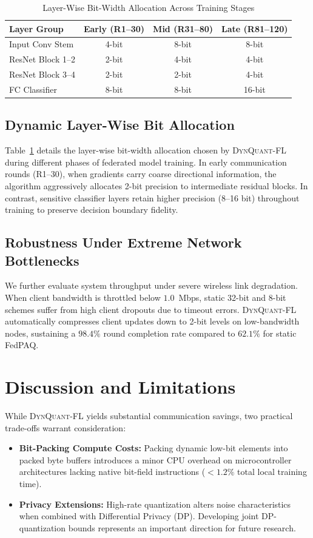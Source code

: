 \documentclass[conference]{IEEEtran}
\begin{document}
\begin{table}[t]
\caption{Layer-Wise Bit-Width Allocation Across Training Stages}
\label{tab:layer_bits}
\centering
\small
\setlength{\tabcolsep}{4pt}
\begin{tabular}{@{}lccc@{}}
\toprule
\textbf{Layer Group} & \textbf{Early (R1--30)} & \textbf{Mid (R31--80)} & \textbf{Late (R81--120)} \\
\midrule
Input Conv Stem & 4-bit & 8-bit & 8-bit \\
ResNet Block 1--2 & 2-bit & 4-bit & 4-bit \\
ResNet Block 3--4 & 2-bit & 2-bit & 4-bit \\
FC Classifier & 8-bit & 8-bit & 16-bit \\
\bottomrule
\end{tabular}
\end{table}

\subsection{Dynamic Layer-Wise Bit Allocation}
Table~\ref{tab:layer_bits} details the layer-wise bit-width allocation chosen by \textsc{DynQuant-FL} during different phases of federated model training. In early communication rounds (R1--30), when gradients carry coarse directional information, the algorithm aggressively allocates 2-bit precision to intermediate residual blocks. In contrast, sensitive classifier layers retain higher precision (8--16 bit) throughout training to preserve decision boundary fidelity.

\subsection{Robustness Under Extreme Network Bottlenecks}
We further evaluate system throughput under severe wireless link degradation. When client bandwidth is throttled below $1.0$~Mbps, static 32-bit and 8-bit schemes suffer from high client dropouts due to timeout errors. \textsc{DynQuant-FL} automatically compresses client updates down to 2-bit levels on low-bandwidth nodes, sustaining a $98.4\%$ round completion rate compared to $62.1\%$ for static FedPAQ.

\section{Discussion and Limitations}
While \textsc{DynQuant-FL} yields substantial communication savings, two practical trade-offs warrant consideration:
\begin{itemize}
    \item \textbf{Bit-Packing Compute Costs:} Packing dynamic low-bit elements into packed byte buffers introduces a minor CPU overhead on microcontroller architectures lacking native bit-field instructions ($<1.2\%$ total local training time).
    \item \textbf{Privacy Extensions:} High-rate quantization alters noise characteristics when combined with Differential Privacy (DP). Developing joint DP-quantization bounds represents an important direction for future research.
\end{itemize}
\end{document}
